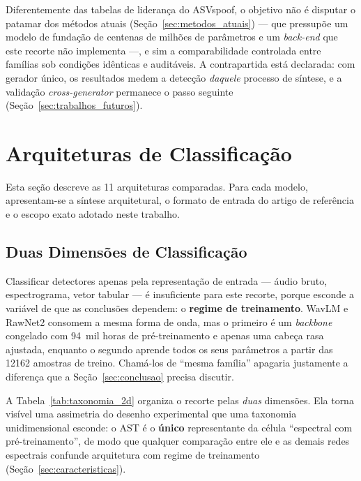 \documentclass[12pt,a4paper]{article}
\begin{document}
\noindent
Diferentemente das tabelas de liderança do ASVspoof, o objetivo não é disputar
o patamar dos métodos atuais (Seção~\ref{sec:metodos_atuais}) --- que pressupõe
um modelo de fundação de centenas de milhões de parâmetros e um
\textit{back-end} que este recorte não implementa ---, e sim a comparabilidade
controlada entre famílias sob condições idênticas e auditáveis. A contrapartida está declarada: com gerador
único, os resultados medem a detecção \emph{daquele} processo de síntese, e a
validação \textit{cross-generator} permanece o passo seguinte
(Seção~\ref{sec:trabalhos_futuros}).

\newpage

\section{Arquiteturas de Classificação}
\label{sec:arquiteturas}

Esta seção descreve as \num{11} arquiteturas comparadas. Para cada modelo,
apresentam-se a síntese arquitetural, o formato de entrada do artigo de
referência e o escopo exato adotado neste trabalho.

\subsection{Duas Dimensões de Classificação}
\label{subsec:taxonomia}

Classificar detectores apenas pela representação de entrada --- áudio bruto,
espectrograma, vetor tabular --- é insuficiente para este recorte, porque
esconde a variável de que as conclusões dependem: o \textbf{regime de
	treinamento}. WavLM e RawNet2 consomem a mesma forma de onda, mas o primeiro é
um \textit{backbone} congelado com \num{94}~mil horas de pré-treinamento e
apenas uma cabeça rasa ajustada, enquanto o segundo aprende todos os seus
parâmetros a partir das \num{12162} amostras de treino. Chamá-los de ``mesma
família'' apagaria justamente a diferença que a Seção~\ref{sec:conclusao}
precisa discutir.

A Tabela~\ref{tab:taxonomia_2d} organiza o recorte pelas \emph{duas} dimensões.
Ela torna visível uma assimetria do desenho experimental que uma taxonomia
unidimensional esconde: o AST é o \textbf{único} representante da célula
``espectral com pré-treinamento'', de modo que qualquer comparação entre ele e
as demais redes espectrais confunde arquitetura com regime de treinamento
(Seção~\ref{sec:caracteristicas}).
\end{document}
